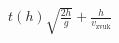 \documentclass[preview]{standalone}
\begin{document}
\begin{align*}
t (h) \sqrt {\frac{2h}{g}} + \frac{h}{v_{\text{zvuk}}}
\end{align*}
\end{document}
